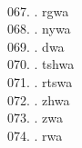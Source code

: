 \begin{tabbing}
\egroup  \\
067.	.	\> rgwa	\> \bgroup\tibetan \def\u#1{\vtop{\baselineskip0pt\hbox{#1}\hbox{\tibsp\char123}}}\parindent=0pt \newbox\fillerbox\setbox\fillerbox\hbox{\vrule height0.4cm depth0.4cm width0pt}\def\filler{\copy\fillerbox} \filler\tibsp{}\tenrm\ \tibetan
\egroup  \\
068.	.	\> nywa	\> \bgroup\tibetan \def\u#1{\vtop{\baselineskip0pt\hbox{#1}\hbox{\tibsp\char123}}}\parindent=0pt \newbox\fillerbox\setbox\fillerbox\hbox{\vrule height0.4cm depth0.4cm width0pt}\def\filler{\copy\fillerbox} \filler\tibsp{}\tenrm\ \tibetan
\egroup  \\
069.	.	\> dwa	\> \bgroup\tibetan \def\u#1{\vtop{\baselineskip0pt\hbox{#1}\hbox{\tibsp\char123}}}\parindent=0pt \newbox\fillerbox\setbox\fillerbox\hbox{\vrule height0.4cm depth0.4cm width0pt}\def\filler{\copy\fillerbox} \filler\tibsp{}\tenrm\ \tibetan
\egroup  \\
070.	.	\> tshwa	\> \bgroup\tibetan \def\u#1{\vtop{\baselineskip0pt\hbox{#1}\hbox{\tibsp\char123}}}\parindent=0pt \newbox\fillerbox\setbox\fillerbox\hbox{\vrule height0.4cm depth0.4cm width0pt}\def\filler{\copy\fillerbox} \filler\tibsp{}\tenrm\ \tibetan
\egroup  \\
071.	.	\> rtswa	\> \bgroup\tibetan \def\u#1{\vtop{\baselineskip0pt\hbox{#1}\hbox{\tibsp\char123}}}\parindent=0pt \newbox\fillerbox\setbox\fillerbox\hbox{\vrule height0.4cm depth0.4cm width0pt}\def\filler{\copy\fillerbox} \filler\tibsp{}\tenrm\ \tibetan
\egroup  \\
072.	. 	\> zhwa 	\> \bgroup\tibetan \def\u#1{\vtop{\baselineskip0pt\hbox{#1}\hbox{\tibsp\char123}}}\parindent=0pt \newbox\fillerbox\setbox\fillerbox\hbox{\vrule height0.4cm depth0.4cm width0pt}\def\filler{\copy\fillerbox} \filler\tibsp{}\tenrm\ \tibetan
\egroup  \\
073.	.	\> zwa	\> \bgroup\tibetan \def\u#1{\vtop{\baselineskip0pt\hbox{#1}\hbox{\tibsp\char123}}}\parindent=0pt \newbox\fillerbox\setbox\fillerbox\hbox{\vrule height0.4cm depth0.4cm width0pt}\def\filler{\copy\fillerbox} \filler\tibsp{}\tenrm\ \tibetan
\egroup  \\
074.	. 	\> rwa 	\> \bgroup\tibetan \def\u#1{\vtop{\baselineskip0pt\hbox{#1}\hbox{\tibsp\char123}}}\parindent=0pt \newbox\fillerbox\setbox\fillerbox\hbox{\vrule height0.4cm depth0.4cm width0pt}\def\filler{\copy\fillerbox} \filler\tibsp{}\tenrm\ \tibetan

\end{tabbing}
